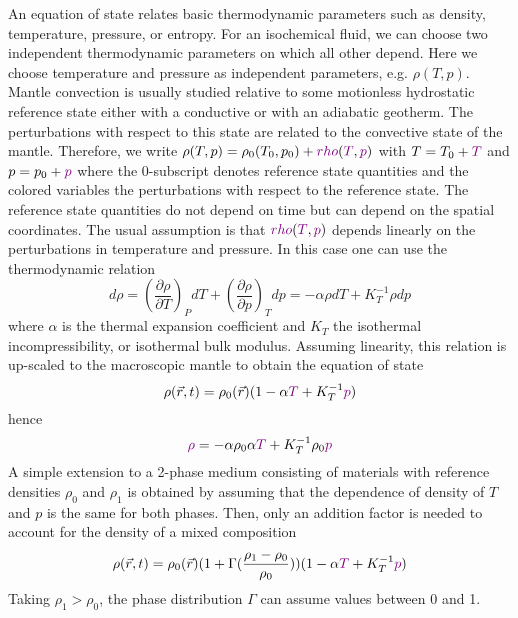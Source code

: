 An equation of state relates basic thermodynamic parameters such as density,
temperature, pressure, or entropy. For an isochemical fluid, we can choose two
independent thermodynamic parameters on which all other depend. Here we choose
temperature and pressure as independent parameters, e.g. $\rho(T,p)$. 
Mantle convection is
usually studied relative to some motionless hydrostatic reference state either with a
conductive or with an adiabatic geotherm. The perturbations with respect to this state are
related to the convective state of the mantle. 
Therefore, we write $\rho(T,p) = \rho_0(T_0,p_0) 
+ {\color{violet}rho}({\color{violet}T},{\color{violet} p} )$
with 
$T = T_0 + {\color{violet}T}$ and 
$p = p_0 + {\color{violet}p}$ 
where the 0-subscript denotes reference
state quantities and the {\color{violet}colored} variables 
the perturbations with respect to the reference state. The
reference state quantities do not depend on time but can depend on the spatial
coordinates. The usual assumption is that ${\color{violet}rho}({\color{violet}T},{\color{violet} p})$ 
depends linearly on the perturbations in temperature and pressure. 
In this case one can use the thermodynamic relation
\[
d\rho = 
\left( \frac{\partial \rho}{\partial T} \right)_P dT + 
\left( \frac{\partial \rho}{\partial p} \right)_T dp 
= -\alpha \rho dT + K_T^{-1} \rho dp
\]
where $\alpha$ is the thermal expansion coefficient and 
$K_T$ the isothermal incompressibility, or isothermal bulk
modulus. Assuming linearity, this relation is up-scaled to the macroscopic mantle to
obtain the equation of state
\begin{equation}
\rho(\vec{r},t) = \rho_0(\vec{r}) (1-\alpha {\color{violet}T} + K_T^{-1} {\color{violet}p} )
\label{eq:md68}
\end{equation}
hence
\[
{\color{violet} \rho} = -\alpha \rho_0 \alpha {\color{violet}T} +  K_T^{-1} \rho_0 {\color{violet}p} 
\]
A simple extension to a 2-phase medium consisting of materials with reference
densities $\rho_0$ and $\rho_1$ is obtained by assuming that the dependence of density of $T$ and $p$ 
is the same for both phases. Then, only an addition factor is needed to account for the
density of a mixed composition
\begin{equation}
\rho(\vec{r},t) = \rho_0(\vec{r})(1+\Gamma(\frac{\rho_1-\rho_0}{\rho_0})) 
(1-\alpha {\color{violet}T} + K_T^{-1} {\color{violet}p} )
\label{eq:md69}
\end{equation}
Taking $\rho_1>\rho_0$, the phase distribution $\Gamma$ can assume values between 0 and 1.

